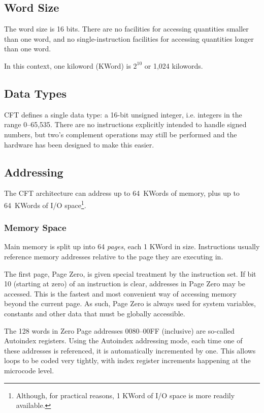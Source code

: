 \documentclass[11pt,a4paper,twocolumns]{article}
\newcommand\hex[1]{\textsf{#1}}
\begin{document}
\subsection{Word Size}

The word size is 16 bits. There are no facilities for accessing
quantities smaller than one word, and no single-instruction facilities
for accessing quantities longer than one word.

In this context, one kiloword (KWord) is $2^{10}$ or 1,024 kilowords.

\subsection{Data Types}

CFT defines a single data type: a 16-bit unsigned integer,
i.e. integers in the range 0–65,535. There are no instructions
explicitly intended to handle signed numbers, but two's complement
operations may still be performed and the hardware has been designed
to make this easier.

\subsection{Addressing}

The CFT architecture can address up to 64~KWords of memory, plus up to
64~KWords of I/O space\footnote{Although, for practical reasons, 1
  KWord of I/O space is more readily available.}.

\subsubsection{Memory Space}

Main memory is split up into 64 {\em pages\/}, each 1 KWord in
size. Instructions usually reference memory addresses relative to the
page they are executing in.

The first page, Page Zero, is given special treatment by the
instruction set. If bit 10 (starting at zero) of an instruction is
clear, addresses in Page Zero may be accessed. This is the fastest and
most convenient way of accessing memory beyond the current page. As
such, Page Zero is always used for system variables, constants and
other data that must be globally accessible.

The 128 words in Zero Page addresses \hex{0080}–\hex{00FF} (inclusive)
are so-called Autoindex registers. Using the Autoindex addressing
mode, each time one of these addresses is referenced, it is
automatically incremented by one. This allows loops to be coded very
tightly, with index register increments happening at the microcode
level.
\end{document}
